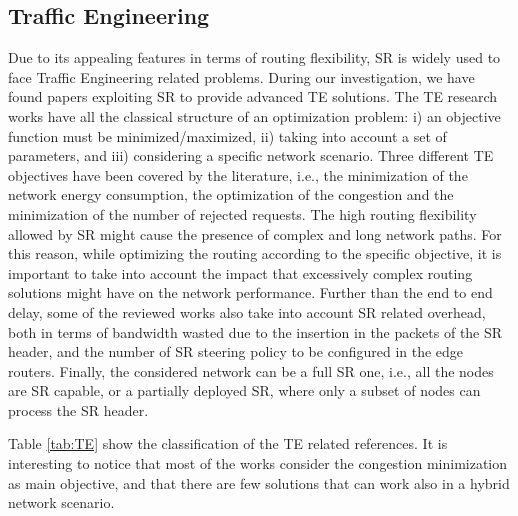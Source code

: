 
\subsection{Traffic Engineering}
\label{sec:te}
Due to its appealing features in terms of routing flexibility, SR is widely used to face Traffic Engineering related problems.
During our investigation, we have found \tePapers papers exploiting SR to provide advanced TE solutions.
The TE research works have all the classical structure of an optimization problem: i) an objective function must be minimized/maximized, ii) taking into account a set of parameters, and iii) considering a specific network scenario.
Three different TE objectives have been covered by the literature, i.e., the minimization of the network energy consumption, the optimization of the congestion and the minimization of the number of rejected requests.
The high routing flexibility allowed by SR might cause the presence of complex and long network paths.
For this reason, while optimizing the routing according to the specific objective, it is important to take into account the impact that excessively complex routing solutions might have on the network performance.
Further than the end to end delay, some of the reviewed works also take into account SR related overhead, both in terms of bandwidth wasted due to the insertion in the packets of the SR header, and the number of SR steering policy to be configured in the edge routers.
Finally, the considered network can be a full SR one, i.e., all the nodes are SR capable, or a partially deployed SR, where only a subset of nodes can process the SR header.

Table \ref{tab:TE} show the classification of the TE related references.
It is interesting to notice that most of the works consider the congestion minimization as main objective, and that there are few solutions that can work also in a hybrid network scenario.

